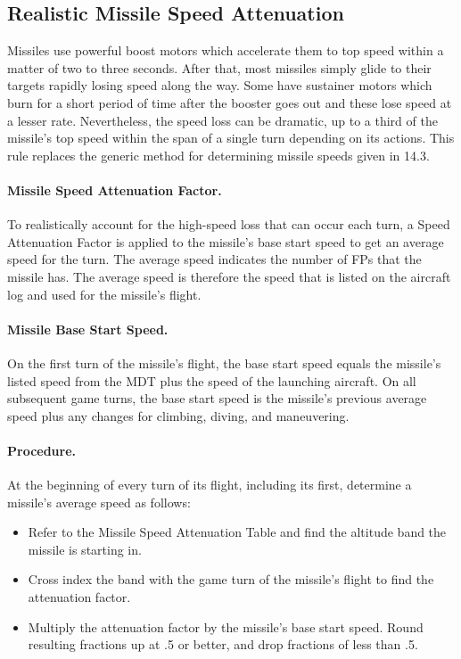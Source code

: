 \advancedrules

\subsection{Realistic Missile Speed Attenuation}

Missiles use powerful boost motors which accelerate them to top speed within a matter of two to three seconds. After that, most missiles simply glide to their targets rapidly losing speed along the way.  Some have sustainer motors which burn for a short period of time after the booster goes out and these lose speed at a lesser rate. Nevertheless, the speed loss can be dramatic, up to a third of the missile's top speed within the span of a single turn depending on its actions. This rule replaces the generic method for determining missile speeds given in 14.3.

\paragraph{Missile Speed Attenuation Factor.} To realistically account for the high-speed loss that can occur each turn, a Speed Attenuation Factor is applied to the missile's base start speed to get an average speed for the turn. The average speed indicates the number of FPs that the missile has. The average speed is therefore the speed that is listed on the aircraft log and used for the missile's flight.

\paragraph{Missile Base Start Speed.} On the first turn of the missile's flight, the base start speed equals the missile's listed speed from the MDT plus the speed of the launching aircraft. On all subsequent game turns, the base start speed is the missile's previous average speed plus any changes for climbing, diving, and maneuvering.

\paragraph{Procedure.} At the beginning of every turn of its flight, including its first, determine a missile's average speed as follows:

\begin{itemize}

    \item Refer to the Missile Speed Attenuation Table and find the altitude band the missile is starting in.

    \item Cross index the band with the game turn of the missile's flight to find the attenuation factor.

    \item Multiply the attenuation factor by the missile's base start speed. Round resulting fractions up at .5 or better, and drop fractions of less than .5.

\end{itemize}

